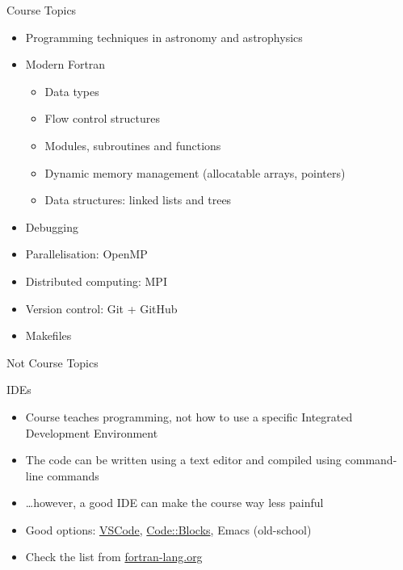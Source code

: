 \begin{frame}{Course Topics}
  \begin{itemize}
  	\item Programming techniques in astronomy and astrophysics
    \item Modern Fortran
      \begin{itemize}
        \item Data types
        \item Flow control structures
        \item Modules, subroutines and functions
        \item Dynamic memory management (allocatable arrays, pointers)
        \item Data structures: linked lists and trees
      \end{itemize}
    \item Debugging
    \item Parallelisation: OpenMP
    \item Distributed computing: MPI
    \item Version control: Git + GitHub
    \item Makefiles
  \end{itemize}
\end{frame}


\begin{frame}{Not Course Topics}
	

		\begin{block}{IDEs}
		\begin{itemize}
			\item Course teaches programming, not how to use a specific Integrated Development Environment
			\item The code can be written using a text editor and compiled using command-line commands
			\item \ldots however, a good IDE can make the course way less painful
			\item Good options: \href{https://code.visualstudio.com}{VSCode}, \href{https://www.codeblocks.org/}{Code::Blocks}, Emacs (old-school)
			\item Check the list from \href{https://fortran-lang.org/learn/os_setup/ides/}{fortran-lang.org}
		\end{itemize}
		\end{block}
		

	
\end{frame}


